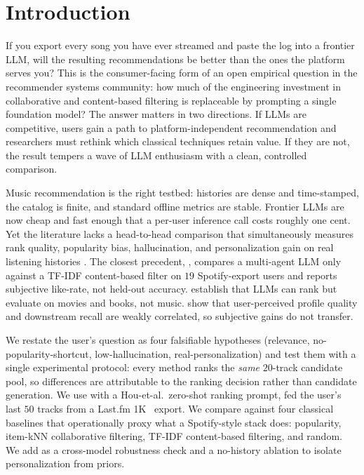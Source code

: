 \section{Introduction}
\label{sec:intro}

If you export every song you have ever streamed and paste the log into a frontier LLM, will the resulting recommendations be better than the ones the platform serves you? This is the consumer-facing form of an open empirical question in the recommender systems community: how much of the engineering investment in collaborative and content-based filtering is replaceable by prompting a single foundation model? The answer matters in two directions. If LLMs are competitive, users gain a path to platform-independent recommendation and researchers must rethink which classical techniques retain value. If they are not, the result tempers a wave of LLM enthusiasm with a clean, controlled comparison.

 Music recommendation is the right testbed: histories are dense and time-stamped, the catalog is finite, and standard offline metrics are stable. Frontier LLMs are now cheap and fast enough that a per-user inference call costs roughly one cent. Yet the literature lacks a head-to-head comparison that simultaneously measures rank quality, popularity bias, hallucination, and personalization gain on real listening histories \citep{epure2025music}. The closest precedent, \citet{boadana2025llm}, compares a multi-agent LLM only against a TF-IDF content-based filter on $19$ Spotify-export users and reports subjective like-rate, not held-out accuracy. \citet{hou2024llm} establish that LLMs can rank but evaluate on movies and books, not music. \citet{sguerra2025biases} show that user-perceived profile quality and downstream recall are weakly correlated, so subjective gains do not transfer.

 We restate the user's question as four falsifiable hypotheses (relevance, no-popularity-shortcut, low-hallucination, real-personalization) and test them with a single experimental protocol: every method ranks the \emph{same} $20$-track candidate pool, so differences are attributable to the ranking decision rather than candidate generation. We use \claude with a Hou-et-al.~zero-shot ranking prompt, fed the user's last $50$ tracks from a Last.fm 1K~\citep{schedl2017lfm1b} export. We compare against four classical baselines that operationally proxy what a Spotify-style stack does: popularity, item-kNN collaborative filtering, TF-IDF content-based filtering, and random. We add \gpt as a cross-model robustness check and a no-history ablation to isolate personalization from priors.

